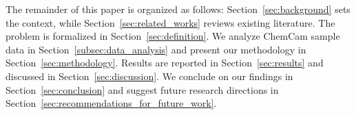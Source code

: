 The remainder of this paper is organized as follows:
Section~\ref{sec:background} sets the context, while Section~\ref{sec:related_works} reviews existing literature.
The problem is formalized in Section~\ref{sec:definition}.
We analyze ChemCam sample data in Section~\ref{subsec:data_analysis} and present our methodology in Section~\ref{sec:methodology}.
Results are reported in Section~\ref{sec:results} and discussed in Section~\ref{sec:discussion}.
We conclude on our findings in Section~\ref{sec:conclusion} and suggest future research directions in Section~\ref{sec:recommendations_for_future_work}.
